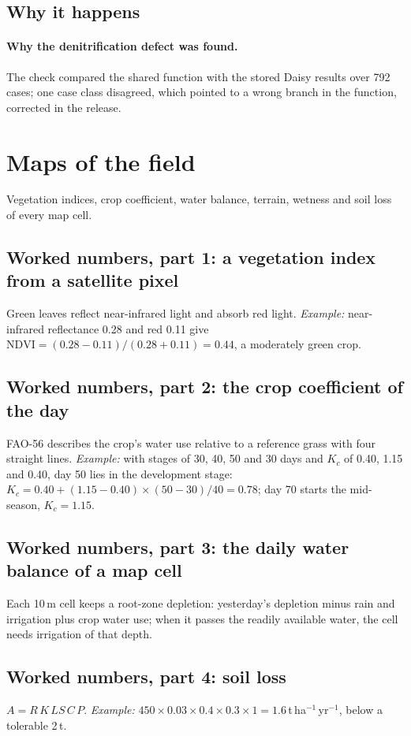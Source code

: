\subsection{Why it happens}
\paragraph{Why the denitrification defect was found.} The check compared the shared function with the stored Daisy results over 792 cases; one case class disagreed, which pointed to a wrong branch in the function, corrected in the release.

\section{Maps of the field}
Vegetation indices, crop coefficient, water balance, terrain, wetness and soil loss of every map cell.

\subsection{Worked numbers, part 1: a vegetation index from a satellite pixel}
Green leaves reflect near-infrared light and absorb red light. \emph{Example:} near-infrared reflectance 0.28 and red 0.11 give $\mathrm{NDVI}=(0.28-0.11)/(0.28+0.11)=0.44$, a moderately green crop.


\subsection{Worked numbers, part 2: the crop coefficient of the day}
FAO-56 describes the crop's water use relative to a reference grass with four straight lines. \emph{Example:} with stages of 30, 40, 50 and 30 days and $K_c$ of 0.40, 1.15 and 0.40, day 50 lies in the development stage: $K_c=0.40+(1.15-0.40)\times(50-30)/40=0.78$; day 70 starts the mid-season, $K_c=1.15$.


\subsection{Worked numbers, part 3: the daily water balance of a map cell}
Each 10\,m cell keeps a root-zone depletion: yesterday's depletion minus rain and irrigation plus crop water use; when it passes the readily available water, the cell needs irrigation of that depth.


\subsection{Worked numbers, part 4: soil loss}
$A=R\,K\,LS\,C\,P$. \emph{Example:} $450\times0.03\times0.4\times0.3\times1=1.6$\,t\,ha$^{-1}$\,yr$^{-1}$, below a tolerable 2\,t.


